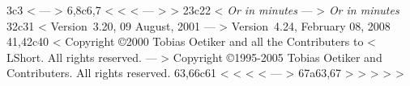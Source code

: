 3c3
< %
---
> %
6,8c6,7
< \ifx\pdfoutput\undefined %
< \else
< 
---
> \ifpdf
>   
23c22
< \hfill\emph{\Large Or \LaTeXe{} in \pageref{verylast} minutes}
---
> \hfill\emph{\Large Or \LaTeXe{} in \pageref{LastPage} minutes}
32c31
< Version~3.20, 09 August, 2001
---
> Version~4.24, February 08, 2008
41,42c40
<   Copyright \copyright 2000 Tobias Oetiker and all the Contributers to
<   LShort.  All rights reserved.
---
>   Copyright \copyright 1995-2005 Tobias Oetiker and Contributers.  All rights reserved.
63,66c61
< %
< %
< %
< %
---
> %
67a63,67
> %
> %
> %
> %
> %
